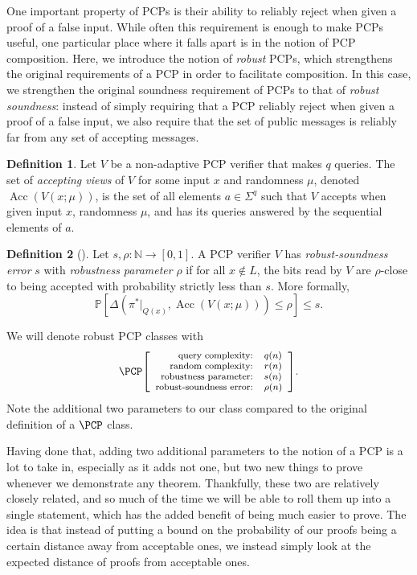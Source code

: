 \documentclass[english,12pt]{reedthesis}
\theoremstyle{plain}
\theoremstyle{definition}
\newtheorem{defn}[defn]{Definition}
\theoremstyle{remark}
\DeclareMathOperator{\Acc}{Acc}
\newcommand{\pcpr}[4]{%
  \ensuremath%
  \mleft[{\footnotesize\begin{array}{r l}
    \text{query complexity:} & #1 \\
    \text{random complexity:} & #2 \\
    \text{robustness parameter:} & #3 \\
    \text{robust-soundness error:} & #4
  \end{array}}\mright]%
}
\begin{document}
One important property of PCPs is their ability to reliably reject when given a
proof of a false input. While often this requirement is enough to make PCPs
useful, one particular place where it falls apart is in the notion of PCP
composition. Here, we introduce the notion of \emph{robust} PCPs, which
strengthens the original requirements of a PCP in order to facilitate
composition. In this case, we strengthen the original soundness requirement of
PCPs to that of \emph{robust soundness}: instead of simply requiring that a PCP
reliably reject when given a proof of a false input, we also require that the
set of public messages is reliably far from any set of accepting messages.

\begin{defn}\label{def:acc(v)}\index{Acc@$\Acc$}
  Let $V$ be a non-adaptive PCP verifier that makes $q$ queries. The set of
  \emph{accepting views} of $V$ for some input $x$ and randomness $\mu$, denoted
  $\Acc(V(x; \mu))$, is the set of all elements $a \in \Sigma^{q}$ such that $V$ accepts
  when given input $x$, randomness $\mu$, and has its queries answered by the
  sequential elements of $a$.
\end{defn}

\begin{defn}[{\cite[Def.\ 2.6]{BGHSV06}}]\label{def:robust-verifer}
  Let $s, \rho\colon \mathbb{N} \rightarrow [0, 1]$. A PCP verifier $V$ has
  \emph{robust-soundness error} $s$ with \emph{robustness parameter} $\rho$ if for
  all $x \notin L$, the bits read by $V$ are $\rho$-close to being accepted with
  probability strictly less than $s$. More formally,
  \begin{equation}
    \mathbb{P}[\Delta(\pi^{*}|_{Q(x)}, \Acc(V(x; \mu))) \le \rho] \le s.
  \end{equation}
\end{defn}

We will denote robust PCP classes with
\[
  \PCP\pcpr{q(n)}{r(n)}{s(n)}{\rho(n)}.
\]
Note the additional two parameters to our class compared to the original
definition of a $\PCP$ class.

Having done that, adding two additional parameters to the notion of a PCP is a
lot to take in, especially as it adds not one, but two new things to prove
whenever we demonstrate any theorem. Thankfully, these two are relatively
closely related, and so much of the time we will be able to roll them up into a
single statement, which has the added benefit of being much easier to prove. The
idea is that instead of putting a bound on the probability of our proofs being a
certain distance away from acceptable ones, we instead simply look at the
expected distance of proofs from acceptable ones.
\end{document}

